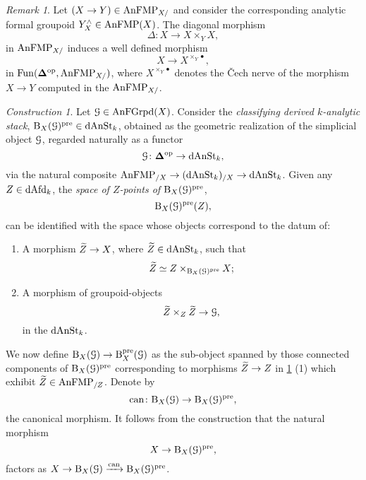 \documentclass[10pt,a4paper,reqno]{amsart} %
\theoremstyle{plain}
\theoremstyle{definition}
\theoremstyle{remark}
\newtheorem{rem}[thm]{Remark}
\numberwithin{equation}{section}
\newtheorem{construction}[thm]{Construction}
\begin{document}
\begin{rem}
    Let $(X \to Y) \in \mathrm{AnFMP}_{X/ }$ and consider the corresponding analytic formal groupoid $Y^\wedge_X \in \mathrm{AnFMP}(X)$. The diagonal morphism
        \[
            \Delta \colon X \to X \times_Y X,   
        \]
    in $\mathrm{AnFMP}_{X/ }$ induces a well defined morphism
        \[
            X \to X^{\times_Y \bullet} ,  
        \]
    in  $\operatorname{Fun}(\bm{\Delta} ^\mathrm{op}, \mathrm{AnFMP}_{X/ })$, where $X^{\times_Y \bullet}$ denotes the \v{C}ech nerve of the morphism $X \to Y$
    computed in the \infcat $\mathrm{AnFMP}_{X/ }$.
\end{rem}

\begin{construction} \label{const:formal_classifying_stack_construction}
    Let $\mathcal G \in \mathrm{AnFGrpd}(X)$. Consider the \emph{classifying derived $k$-analytic stack}, $\mathrm B_X(\mathcal G)^{\mathrm{pre}} \in \mathrm{dAnSt}_k$, obtained as the geometric realization
    of the simplicial object $\mathcal G$, regarded naturally as a functor
        \[
            \mathcal G \colon \bm{\Delta} ^\mathrm{op} \to \mathrm{dAnSt}_k,
        \]
    via the natural composite $\mathrm{AnFMP}_{/ X} \to (\mathrm{dAnSt}_k)_{/ X} \to \mathrm{dAnSt}_k$.
    Given any $Z \in \mathrm{dAfd}_k$, the \emph{space of $Z$-points of $\mathrm B_X(\mathcal G)^{\mathrm{pre}}$},
        \[
            \mathrm B_X(\mathcal G)^\mathrm{pre}(Z),  
        \]
    can be identified with the space whose objects correspond to the datum of:
        \begin{enumerate}
            \item A morphism $\widetilde Z \to X$, where $\widetilde Z \in \mathrm{dAnSt}_k$, such that
                \[
                    \widetilde Z \simeq Z \times_{\mathrm B_X(\mathcal G)^\mathrm{pre}} X;  
                \]
            \item A morphism of groupoid-objects
                \[\widetilde Z \times_Z \widetilde Z \to \mathcal G,\]
                in the \infcat $\mathrm{dAnSt}_k$.
        \end{enumerate}
    We now define $\mathrm B_X(\mathcal G) \to \mathrm B^\mathrm{pre}_X(\mathcal G)$ as the sub-object spanned by those connected components of $\mathrm B_X(\mathcal G)^\mathrm{pre}$ corresponding to
    morphisms $\widetilde Z \to Z$ in \cref{const:formal_classifying_stack_construction} (1)
    which exhibit $\widetilde Z \in \mathrm{AnFMP}_{/Z}$. Denote by
        \[
            \mathrm{can} \colon \mathrm B_X(\mathcal G) \to \mathrm B_X(\mathcal G)^\mathrm{pre},  
        \]
    the canonical morphism. It follows from the construction that the natural morphism    
        \[
            X \to \mathrm B_X(\mathcal G)^\mathrm{pre},  
        \]
    factors as $X \to \mathrm B_X(\mathcal G) \xrightarrow{\mathrm{can}} \mathrm B_X(\mathcal G)^\mathrm{pre}$.
\end{construction}
\end{document}

